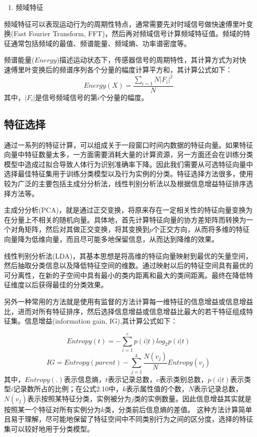 \begin{enumerate}[(2)]
	\item 频域特征
\end{enumerate}
\par 频域特征可以表现运动行为的周期性特点，通常需要先对时域信号做快速傅里叶变换(Fast Fourier Transform, FFT)，然后再对频域信号计算频域特征值。频域的特征通常包括频域的最值、频谱能量、频域熵、功率谱密度等。
\par 频谱能量($Energy$)描述运动状态下，传感器信号的周期特性，其计算方式为对快速傅里叶变换后的频谱序列各个分量的幅度计算平方和，其计算公式如下：
\begin{equation}
	Energy(X) = \frac{\sum_{i=1}{N}|F_i|^2}{N}
\end{equation}
其中，$|F_i|$是信号频域信号的第$i$个分量的幅度。

\subsection{特征选择}
\par 通过一系列的特征计算，可以组成关于一段窗口时间内数据的特征向量。如果特征向量中特征数量太多，一方面需要消耗大量的计算资源，另一方面还会在训练分类模型中造成过拟合导致人体行为识别准确率下降。因此我们需要从可选特征向量中选择最佳特征集用于训练分类模型以及行为实例的分类。特征选择方法很多，使用较为广泛的主要包括主成分分析法，线性判别分析法以及根据信息增益特征排序选择方法等。
\par 主成分分析(PCA)，就是通过正交变换，将原来存在一定相关性的特征向量变换为在分量上不相关的随机向量。具体地，首先计算特征向量的协方差矩阵而转换为一个对角矩阵，然后对其做正交变换，将其变换到$p$个正交方向，从而将多维的特征向量降为低维向量，而且尽可能多地保留信息，从而达到降维的效果。
\par 线性判别分析法(LDA)，其基本思想是将高维的特征向量映射到最优的矢量空间，然后抽取分类信息以及降低特征空间的维数。通过映射以后的特征空间具有最优的可分离性，在新的子空间中具有最小的类内距离和最大的类间距离。最终在降低特征维度以后获得最佳的分类效果。
\par 另外一种常用的方法就是使用有监督的方法计算每一维特征的信息增益或信息增益比，进而对所有特征排序，然后选择信息增益或信息增益比最大的若干特征组成特征集。信息增益(information gain, IG),其计算公式如下：

\begin{equation}
	Entropy(t) = -\sum_{i=1}^{c}p(i|t)log_2p(i|t)
\end{equation}
\begin{equation}
	IG = Entropy(parent) - \sum_{j=1}^{k}\frac{N(v_j)}{N}Entropy(v_j)
\end{equation}
其中，$Entropy(.)$表示信息熵，$t$表示记录总数，$c$表示类别总数，$p(i|t)$表示类型$i$记录数所占的比例；在公式2.10中，$k$表示属性值的个数，$N$表示记录总数，$N(v_j)$表示按照某特征分类，实例被分为$j$类的实例数量。因此信息增益其实就是按照某一个特征对所有实例分为$k$类，分类前后信息熵的差值。
这种方法计算简单且易于理解，尽可能地保留了特征空间中不同类别行为之间的区分度，选择的特征集可以较好地用于分类模型。

